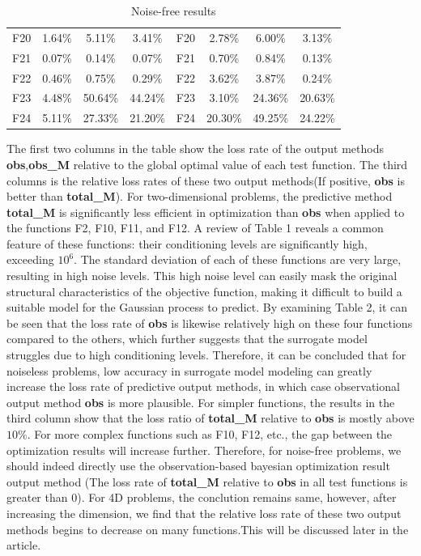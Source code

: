 \documentclass{article}
\begin{document}
\begin{table}[!ht]
{\begin{tabular}{|c|ccc|c|ccc|}
		\cline{1-8}
        F20 & 1.64\% & 5.11\% & 3.41\% & F20 & 2.78\% & 6.00\% & 3.13\% \\ 
        F21 & 0.07\% & 0.14\% & 0.07\% & F21 & 0.70\% & 0.84\% & 0.13\% \\ 
        F22 & 0.46\% & 0.75\% & 0.29\% & F22 & 3.62\% & 3.87\% & 0.24\% \\ 
        F23 & 4.48\% & 50.64\% & 44.24\% & F23 & 3.10\% & 24.36\% & 20.63\% \\ 
        F24 & 5.11\% & 27.33\% & 21.20\% & F24 & 20.30\% & 49.25\% & 24.22\% \\ \hline
    \end{tabular}
	}
	\caption{Noise-free results}
\end{table}
 
  \hspace{2em}The first two columns in the table show the loss rate of the output methods \textbf{obs},\textbf{obs\_M} relative to the global optimal value of each test function. The third columns is the relative loss rates of these two output methods(If positive, \textbf{obs} is better than \textbf{total\_M}). For two-dimensional problems, the predictive method \textbf{total\_M} is significantly less efficient in optimization than \textbf{obs} when applied to the functions F2, F10, F11, and F12. A review of Table 1 reveals a common feature of these functions: their conditioning levels are significantly high, exceeding $10^6$. The standard deviation of each of these functions are very large, resulting in high noise levels. This high noise level can easily mask the original structural characteristics of the objective function, making it difficult to build a suitable model for the Gaussian process to predict. By examining Table 2, it can be seen that the loss rate of \textbf{obs} is likewise relatively high on these four functions compared to the others, which further suggests that the surrogate model struggles due to high conditioning levels. Therefore, it can be concluded that for noiseless problems, low accuracy in surrogate model modeling can greatly increase the loss rate of predictive output methods, in which case observational output method \textbf{obs} is more plausible. For simpler functions, the results in the third column show that the loss ratio of \textbf{total\_M} relative to \textbf{obs} is mostly above $10\%$. For more complex functions such as F10, F12, etc., the gap between the optimization results will increase further. Therefore, for noise-free problems, we should indeed directly use the observation-based bayesian optimization result output method (The loss rate of \textbf{total\_M} relative to \textbf{obs} in all test functions is greater than 0). For 4D problems, the conclution remains same, however, after increasing the dimension, we find that the relative loss rate of these two output methods begins to decrease on many functions.This will be discussed later in the article.
\end{document}
